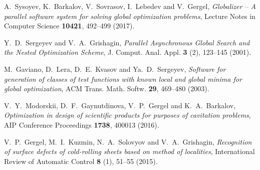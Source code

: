 \documentclass[
11pt,%
tightenlines,%
twoside,%
onecolumn,%
nofloats,%
nobibnotes,%
nofootinbib,%
superscriptaddress,%
noshowpacs,%
centertags]%
{revtex4}
\begin{document}
\begin{thebibliography}{20}
A.~Sysoyev, K.~Barkalov, V.~Sovrasov, I.~Lebedev and V.~Gergel, \textit{Globalizer -- A parallel software system for solving global optimization problems}, Lecture Notes in Computer Science \textbf{10421}, 492--499 (2017). 

Y.~D.~Sergeyev and V.~A.~Grishagin, \textit{Parallel Asynchronous Global Search and the Nested Optimization Scheme}, J. Comput. Anal. Appl. \textbf{3} (2), 123--145 (2001).

M.~Gaviano, D.~Lera, D.~E.~Kvasov and Ya.~D.~Sergeyev, \textit{Software for generation of classes of test functions with known local and global minima for global optimization}, ACM Trans. Math. Softw. \textbf{29}, 469--480 (2003).

V.~Y.~Modorskii, D.~F.~Gaynutdinova, V.~P.~Gergel and K.~A.~Barkalov, \textit{Optimization in design of scientific products for purposes of cavitation problems}, AIP Conference Proceedings \textbf{1738}, 400013 (2016).

V.~P.~Gergel, M.~I.~Kuzmin, N.~A.~Solovyov and V.~A.~Grishagin, \textit{Recognition of surface defects of cold-rolling sheets based on method of localities}, International Review of Automatic Control \textbf{8} (1), 51--55 (2015).

\end{thebibliography}
\end{document}
